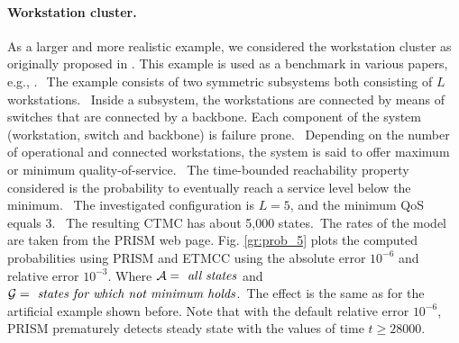 \documentclass[times, 10pt,twocolumn]{article}
\begin{document}
	\paragraph{Workstation cluster. \label{ss:work_clust}}
		As a larger and more realistic example, we considered the workstation cluster as originally proposed in \cite{HaverkortHK_SRDS00}. This example is used as a benchmark in various papers, e.g., \cite{BuchholzKKT_JLAP03, YounesKNP_TACAS04, KwiatkowskaNP_IMTTCPE02, Prism_WC05}.$\:$ The example consists of two symmetric subsystems both consisting of $L$ workstations.  Inside a subsystem, the workstations are connected by means of switches that are connected by a backbone. Each component of the system (workstation, switch and backbone) is failure prone.  Depending on the number of operational and connected workstations, the system is said to offer maximum or minimum quality-of-service.  The time-bounded reachability property considered is the probability to eventually reach a service level below the minimum.  The investigated configuration is $L{=}5$, and the minimum QoS equals 3.  The resulting CTMC has about 5,000 states. The rates of the model are taken from the PRISM web page. Fig. \ref{gr:prob_5} plots the computed probabilities using PRISM and ETMCC using the absolute error $10^{{-}6}$ and relative error $10^{{-}3}$. Where $\mathcal{A} = \text{\emph{ all states}}$ and $\mathcal{G} = \text{\emph{ states for which not minimum holds}}$. The effect is the same as for the artificial example shown before.
		Note that with the default relative error $10^{{-}6}$, PRISM prematurely detects steady state with the values of time $t \geq 28000$.
\end{document}
